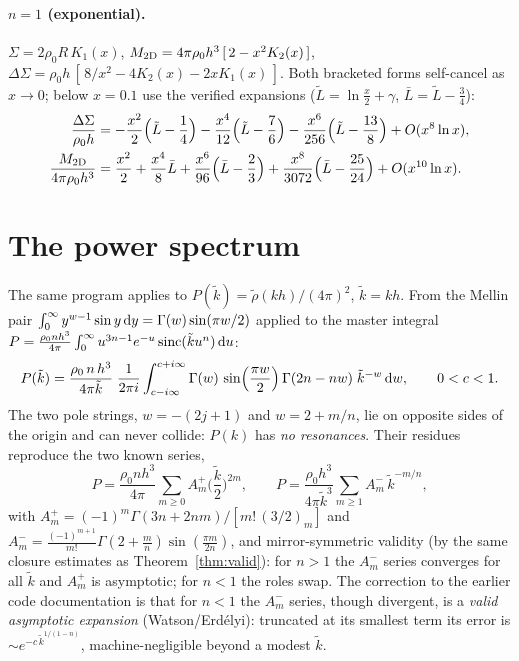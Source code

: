 \documentclass{article}
\begin{document}
\paragraph{$n=1$ (exponential).}
$\Sigma = 2\rho_0 R\,K_1(x)$,\quad
$M_{\rm 2D} = 4\pi\rho_0h^3\,[\,2-x^2K_2(x)\,]$,\quad
$\Delta\Sigma = \rho_0 h\,[\,8/x^2 - 4K_2(x) - 2xK_1(x)\,]$.
Both bracketed forms self-cancel as $x\to0$; below $x=0.1$ use the verified
expansions ($\tilde L = \ln\tfrac x2+\gamma$, $\bar L = \tilde L-\tfrac34$):
\begin{align}
\frac{\Delta\Sigma}{\rho_0 h} &=
-\frac{x^2}{2}\Big(\tilde L-\frac14\Big)
-\frac{x^4}{12}\Big(\tilde L-\frac76\Big)
-\frac{x^6}{256}\Big(\tilde L-\frac{13}{8}\Big)+O(x^8\ln x),\\
\frac{M_{\rm 2D}}{4\pi\rho_0h^3} &=
\frac{x^2}{2}+\frac{x^4}{8}\bar L
+\frac{x^6}{96}\Big(\bar L-\frac23\Big)
+\frac{x^8}{3072}\Big(\bar L-\frac{25}{24}\Big)+O(x^{10}\ln x).
\end{align}

\section{The power spectrum}\label{sec:pk}

The same program applies to
$P(\tilde k) = \tilde\rho(kh)/(4\pi)^2$, $\tilde k = kh$. From the Mellin
pair $\int_0^\infty y^{w-1}\sin y\,{\rm d}y = \Gamma(w)\sin(\pi w/2)$
applied to the master integral
$P = \frac{\rho_0 n h^3}{4\pi}\int_0^\infty u^{3n-1}e^{-u}\,
\mathrm{sinc}(\tilde k u^n)\,{\rm d}u$:
\begin{equation}\label{eq:pk-mb}
P(\tilde k) = \frac{\rho_0\, n\, h^3}{4\pi\tilde k}\;\frac{1}{2\pi i}
\int_{c-i\infty}^{c+i\infty}
\Gamma(w)\,\sin\!\Big(\frac{\pi w}{2}\Big)\,\Gamma(2n-nw)\;
\tilde k^{-w}\,{\rm d}w, \qquad 0<c<1 .
\end{equation}
The two pole strings, $w=-(2j+1)$ and $w = 2+m/n$, lie on opposite sides of
the origin and can never collide: $P(k)$ has \emph{no resonances}. Their
residues reproduce the two known series,
\begin{equation}\label{eq:pk-series}
P = \frac{\rho_0 n h^3}{4\pi}\sum_{m\ge0} A_m^+
\Big(\frac{\tilde k}{2}\Big)^{2m},
\qquad
P = \frac{\rho_0 h^3}{4\pi\tilde k^3}\sum_{m\ge1} A_m^-\,\tilde k^{-m/n},
\end{equation}
with $A_m^+ = (-1)^m\Gamma(3n+2nm)/[m!\,(3/2)_m]$ and
$A_m^- = \frac{(-1)^{m+1}}{m!}\Gamma(2+\tfrac mn)\sin(\tfrac{\pi m}{2n})$,
and mirror-symmetric validity (by the same closure estimates as
Theorem~\ref{thm:valid}): for $n>1$ the $A_m^-$ series converges for all
$\tilde k$ and $A_m^+$ is asymptotic; for $n<1$ the roles swap. The
correction to the earlier code documentation is that for $n<1$ the $A_m^-$
series, though divergent, is a \emph{valid asymptotic expansion}
(Watson/Erd\'elyi): truncated at its smallest term its error is
$\sim e^{-c\,\tilde k^{1/(1-n)}}$, machine-negligible beyond a modest
$\tilde k$.
\end{document}
